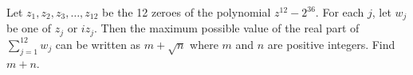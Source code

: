 Let $z_1,z_2,z_3,\dots,z_{12}$ be the 12 zeroes of the polynomial $z^{12}-2^{36}$. For each $j$, let $w_j$ be one of $z_j$ or $i z_j$. Then the maximum possible value of the real part of $\displaystyle\sum_{j=1}^{12} w_j$ can be written as $m+\sqrt{n}$ where $m$ and $n$ are positive integers. Find $m+n$.
